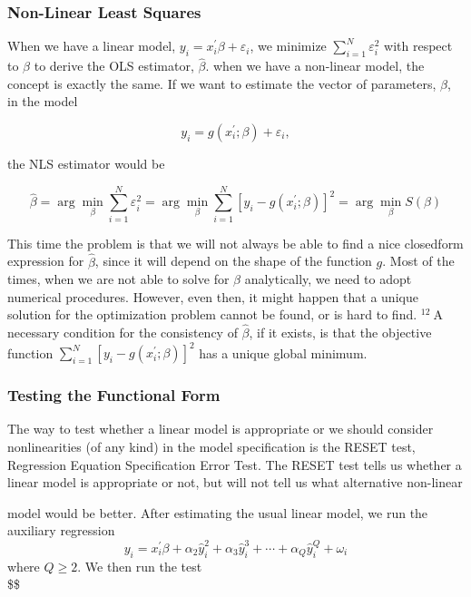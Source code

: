 \subsubsection{Non-Linear Least Squares}
When we have a linear model, $y_{i}=x_{i}^{\prime} \beta+\varepsilon_{i}$, we minimize $\sum_{i=1}^{N} \varepsilon_{i}^{2}$ with respect to $\beta$ to derive the OLS estimator, $\widehat{\beta}$. when we have a non-linear model, the concept is exactly the same. If we want to estimate the vector of parameters, $\beta$, in the model

$$
y_{i}=g\left(x_{i}^{\prime} ; \beta\right)+\varepsilon_{i},
$$

the NLS estimator would be

$$
\widehat{\beta}=\arg \min _{\beta} \sum_{i=1}^{N} \varepsilon_{i}^{2}=\arg \min _{\beta} \sum_{i=1}^{N}\left[y_{i}-g\left(x_{i}^{\prime} ; \beta\right)\right]^{2}=\arg \min _{\beta} S(\beta)
$$

This time the problem is that we will not always be able to find a nice closedform expression for $\widehat{\beta}$, since it will depend on the shape of the function $g$. Most of the times, when we are not able to solve for $\beta$ analytically, we need to adopt numerical procedures. However, even then, it might happen that a unique solution for the optimization problem cannot be found, or is hard to find. ${ }^{12} \mathrm{~A}$ necessary condition for the consistency of $\widehat{\beta}$, if it exists, is that the objective function $\sum_{i=1}^{N}\left[y_{i}-g\left(x_{i}^{\prime} ; \beta\right)\right]^{2}$ has a unique global minimum.

\subsubsection{Testing the Functional Form}
The way to test whether a linear model is appropriate or we should consider nonlinearities (of any kind) in the model specification is the RESET test, Regression Equation Specification Error Test. The RESET test tells us whether a linear model is appropriate or not, but will not tell us what alternative non-linear

model would be better. After estimating the usual linear model, we run the auxiliary regression
$$
y_{i}=x_{i}^{\prime} \beta+\alpha_{2} \widehat{y}_{i}^{2}+\alpha_{3} \widehat{y}_{i}^{3}+\cdots+\alpha_{Q} \widehat{y}_{i}^{Q}+\omega_{i}
$$
where $Q \geq 2$. We then run the test\\
\$\$


